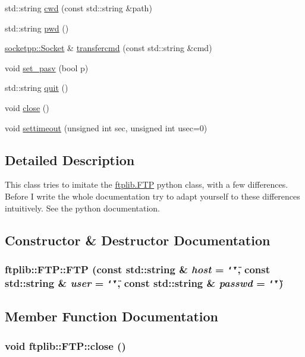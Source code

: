 \begin{CompactItemize}
\item 
std::string \hyperlink{classftplib_1_1FTP_7cd3c7fc71ae0c7dbdfcee88417d2685}{cwd} (const std::string \&path)
\item 
std::string \hyperlink{classftplib_1_1FTP_7c01c7b062848c7fc1d3caf95758b109}{pwd} ()
\item 
\hyperlink{classsocketpp_1_1Socket}{socketpp::Socket} \& \hyperlink{classftplib_1_1FTP_c949b3cd7b92534705ff041bb43d989b}{transfercmd} (const std::string \&cmd)
\item 
void \hyperlink{classftplib_1_1FTP_e35230239f093f01fb295ccb007de1b2}{set\_\-pasv} (bool p)
\item 
std::string \hyperlink{classftplib_1_1FTP_bd6e018a5cc17b1c8007064830823c71}{quit} ()
\item 
void \hyperlink{classftplib_1_1FTP_4f36be9f23721435f19a7e5b1d702718}{close} ()
\item 
void \hyperlink{classftplib_1_1FTP_5e1c861ff05a0e2ecc0d49d81ba73c5a}{settimeout} (unsigned int sec, unsigned int usec=0)
\end{CompactItemize}


\subsection{Detailed Description}
This class tries to imitate the \hyperlink{classftplib_1_1FTP}{ftplib.FTP} python class, with a few differences. Before I write the whole documentation try to adapt yourself to these differences intuitively. See the python documentation. 

\subsection{Constructor \& Destructor Documentation}
\hypertarget{classftplib_1_1FTP_7f153b44f41536e85297b08ed65b948e}{
\subsubsection[{FTP}]{\setlength{\rightskip}{0pt plus 5cm}ftplib::FTP::FTP (const std::string \& {\em host} = {\tt \char`\"{}\char`\"{}}, \/  const std::string \& {\em user} = {\tt \char`\"{}\char`\"{}}, \/  const std::string \& {\em passwd} = {\tt \char`\"{}\char`\"{}})}}
\label{classftplib_1_1FTP_7f153b44f41536e85297b08ed65b948e}




\subsection{Member Function Documentation}
\hypertarget{classftplib_1_1FTP_4f36be9f23721435f19a7e5b1d702718}{
\subsubsection[{close}]{\setlength{\rightskip}{0pt plus 5cm}void ftplib::FTP::close ()}}
\label{classftplib_1_1FTP_4f36be9f23721435f19a7e5b1d702718}


